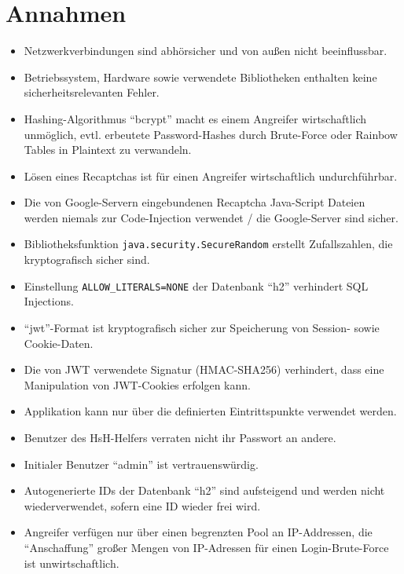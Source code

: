 \documentclass[fontsize=12pt,DIV=14,BCOR=10mm,a4paper,parskip=half-,ngerman,english,bibliography=totocnumbered]{scrreprt}
\begin{document}
\vspace*{-3cm}

\clearpage

\tableofcontents  %

\clearpage

\chapter{Annahmen}

\begin{itemize}
  \item Netzwerkverbindungen sind abhörsicher und von außen nicht beeinflussbar.
  \item Betriebssystem, Hardware sowie verwendete Bibliotheken enthalten keine sicherheitsrelevanten Fehler.
  \item Hashing-Algorithmus \enquote{bcrypt} macht es einem Angreifer wirtschaftlich unmöglich, evtl. erbeutete Password-Hashes durch Brute-Force oder Rainbow Tables in Plaintext zu verwandeln.
  \item Lösen eines Recaptchas ist für einen Angreifer wirtschaftlich undurchführbar.
  \item Die von Google-Servern eingebundenen Recaptcha Java-Script Dateien werden niemals zur Code-Injection verwendet / die Google-Server sind sicher.
  \item Bibliotheksfunktion \texttt{java.security.SecureRandom} \autocite{JavaDocs.SecureRandom} erstellt Zufallszahlen, die kryptografisch sicher sind.
  \item Einstellung \texttt{ALLOW\_LITERALS=NONE} der Datenbank \enquote{h2} verhindert SQL Injections.
  \item \enquote{\gls{jwt}}-Format ist kryptografisch sicher zur Speicherung von Session- sowie Cookie-Daten.
  \item Die von JWT verwendete Signatur (HMAC-SHA256) verhindert, dass eine Manipulation von JWT-Cookies erfolgen kann.
  \item Applikation kann nur über die definierten Eintrittspunkte verwendet werden.
  \item Benutzer des HsH-Helfers verraten nicht ihr Passwort an andere.
  \item Initialer Benutzer \enquote{admin} ist vertrauenswürdig.
  \item Autogenerierte IDs der Datenbank \enquote{h2} sind aufsteigend und werden nicht wiederverwendet, sofern eine ID wieder frei wird.
  \item Angreifer verfügen nur über einen begrenzten Pool an IP-Addressen, die \enquote{Anschaffung} großer Mengen von IP-Adressen für einen Login-Brute-Force ist unwirtschaftlich.

\end{itemize}
\end{document}
